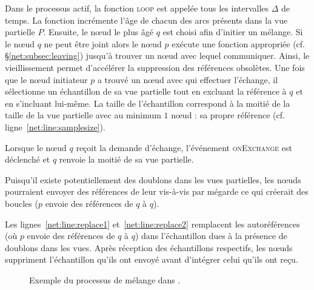 Dans le processus actif, la fonction \textsc{loop} est appelée tous les
intervalles $\Delta$ de temps. La fonction incrémente l'âge de chacun des arcs
présents dans la vue partielle $P$. Ensuite, le nœud le plus âgé $q$ est choisi
afin d'initier un mélange. Si le nœud $q$ ne peut être joint alors le nœud $p$
exécute une fonction appropriée (cf.  §\ref{net:subsec:leaving}) jusqu'à trouver
un nœud avec lequel communiquer. Ainsi, le \og vieillissement \fg permet
d'accélérer la suppression des références obsolètes. Une fois que le nœud
initiateur $p$ a trouvé un nœud avec qui effectuer l'échange, il sélectionne un
échantillon de sa vue partielle tout en excluant la référence à $q$ et en
s'incluant lui-même. La taille de l'échantillon correspond à la moitié de la
taille de la vue partielle avec au minimum $1$ nœud : sa propre référence
(cf. ligne~\ref{net:line:samplesize}).


Lorsque le nœud $q$ reçoit la demande d'échange, l'événement \textsc{onExchange}
est déclenché et $q$ renvoie la moitié de sa vue partielle. 

Puisqu'il existe potentiellement des doublons dans les vues partielles, les
nœuds pourraient envoyer des références de leur vis-à-vis par mégarde ce qui
créerait des boucles ($p$ envoie des références de $q$ à $q$).  

Les lignes~\ref{net:line:replace1} et~\ref{net:line:replace2} remplacent les
autoréférences (où $p$ envoie des références de $q$ à $q$) dans l'échantillon
dues à la présence de doublons dans les vues.  Après réception des échantillons
respectifs, les nœuds suppriment l'échantillon qu'ils ont envoyé avant
d'intégrer celui qu'ils ont reçu.

\begin{figure*}
  \centering
  \hspace{40pt}
  \hspace{10pt}
  \caption[Processus de mélange périodique dans \SPRAY]
  {\label{net:fig:cyclicexample}Exemple du processus de mélange dans \SPRAY.}
\end{figure*}

